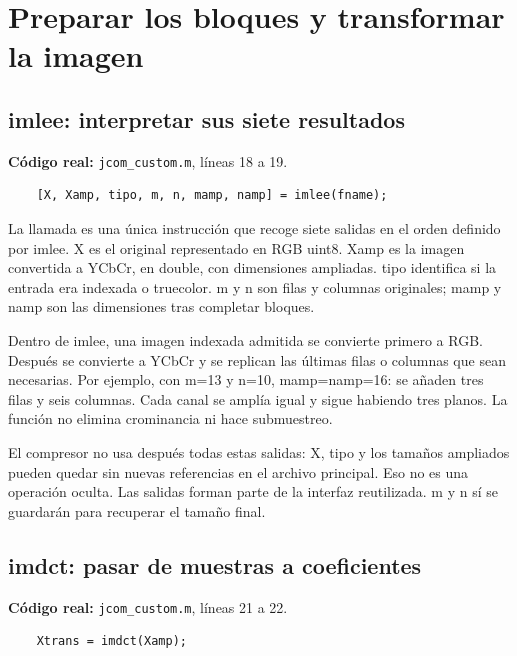 \documentclass[11pt,a4paper,oneside]{report}
\begin{document}
\section{Preparar los bloques y transformar la imagen}

\par\medskip\noindent\begin{minipage}{\linewidth}

\subsection{imlee: interpretar sus siete resultados}

\textbf{Código real:} \texttt{jcom\_custom.m}, líneas 18 a 19.

\begin{lstlisting}[firstnumber=18]
    % PASO 2: leer y acondicionar la imagen.
    [X, Xamp, tipo, m, n, mamp, namp] = imlee(fname);
\end{lstlisting}

\end{minipage}\par


La llamada es una única instrucción que recoge siete salidas en el orden
definido por imlee. X es el original representado en RGB uint8. Xamp es la
imagen convertida a YCbCr, en double, con dimensiones ampliadas. tipo identifica
si la entrada era indexada o truecolor. m y n son filas y columnas originales;
mamp y namp son las dimensiones tras completar bloques.

Dentro de imlee, una imagen indexada admitida se convierte primero a RGB.
Después se convierte a YCbCr y se replican las últimas filas o columnas que
sean necesarias. Por ejemplo, con m=13 y n=10, mamp=namp=16: se añaden tres
filas y seis columnas. Cada canal se amplía igual y sigue habiendo tres planos.
La función no elimina crominancia ni hace submuestreo.

El compresor no usa después todas estas salidas: X, tipo y los tamaños ampliados
pueden quedar sin nuevas referencias en el archivo principal. Eso no es una
operación oculta. Las salidas forman parte de la interfaz reutilizada. m y n
sí se guardarán para recuperar el tamaño final.


\par\medskip\noindent\begin{minipage}{\linewidth}

\subsection{imdct: pasar de muestras a coeficientes}

\textbf{Código real:} \texttt{jcom\_custom.m}, líneas 21 a 22.

\begin{lstlisting}[firstnumber=21]
    % PASO 3: transformar la imagen mediante DCT.
    Xtrans = imdct(Xamp);
\end{lstlisting}

\end{minipage}\par
\end{document}
